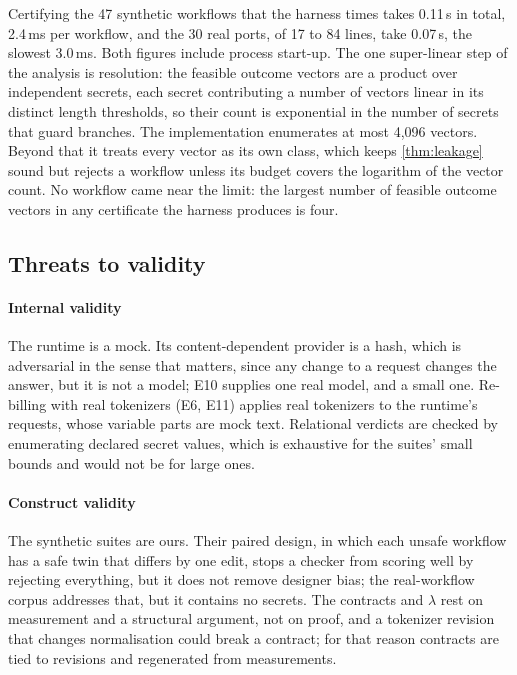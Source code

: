 Certifying the 47 synthetic workflows that the harness times takes 0.11\,s in total,
2.4\,ms per workflow, and the 30 real ports, of 17 to 84 lines, take 0.07\,s, the
slowest 3.0\,ms. Both figures include process start-up. The one super-linear step of
the analysis is resolution: the feasible outcome vectors are a product over
independent secrets, each secret contributing a number of vectors linear in its
distinct length thresholds, so their count is exponential in the number of secrets
that guard branches. The implementation enumerates at most 4,096 vectors. Beyond that
it treats every vector as its own class, which keeps \cref{thm:leakage} sound but rejects
a workflow unless its budget covers the logarithm of the vector count. No workflow came
near the limit: the largest number of feasible outcome vectors in any certificate the
harness produces is four.

\subsection{Threats to validity}\label{sec:threats}

\paragraph{Internal validity} The runtime is a mock. Its content-dependent provider is
a hash, which is adversarial in the sense that matters, since any change to a request
changes the answer, but it is not a model; E10 supplies one real model, and a small one.
Re-billing with real tokenizers (E6, E11) applies real tokenizers to the runtime's
requests, whose variable parts are mock text. Relational verdicts are checked by
enumerating declared secret values, which is exhaustive for the suites' small bounds
and would not be for large ones.

\paragraph{Construct validity} The synthetic suites are ours. Their paired design, in
which each unsafe workflow has a safe twin that differs by one edit, stops a checker
from scoring well by rejecting everything, but it does not remove designer bias; the
real-workflow corpus addresses that, but it contains no secrets. The contracts and
$\lambda$ rest on measurement and a structural argument, not on proof, and a tokenizer
revision that changes normalisation could break a contract; for that reason contracts
are tied to revisions and regenerated from measurements.

